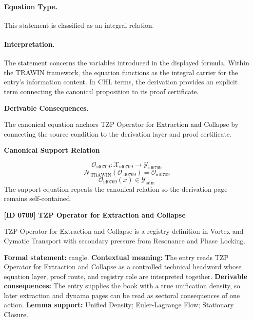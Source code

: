 \paragraph{Equation Type.}
This statement is classified as an integral relation.

\paragraph{Interpretation.}
The statement concerns the variables introduced in the displayed formula. Within the TRAWIN framework, the equation functions as the integral carrier for the entry’s information content. In CHL terms, the derivation provides an explicit term connecting the canonical proposition to its proof certificate.

\par\vspace{0.35em}
\noindent\textbf{Derivable Consequences.}\quad
\begingroup
\footnotesize
\raggedright
The canonical equation anchors TZP Operator for Extraction and Collapse by connecting the source condition to the derivation layer and proof certificate.
\par\endgroup

\noindent\textbf{Canonical Support Relation}\par
\[
\mathcal{O}_{\mathrm{id0709}}:\mathcal{X}_{\mathrm{id0709}}\longrightarrow\mathcal{Y}_{\mathrm{id0709}}
\]
\[
\mathcal{N}_{\mathrm{TRAWIN}}(\mathcal{O}_{\mathrm{id0709}})=\mathcal{O}_{\mathrm{id0709}}
\]
\[
\mathcal{O}_{\mathrm{id0709}}(x)\in\mathcal{Y}_{\mathrm{adm}}
\]
\noindent The support equation repeats the canonical relation so the derivation page remains self-contained.\par

\clearpage
\noindent\textbf{[ID 0709] TZP Operator for Extraction and Collapse}\par
\vspace{0.35em}
\begingroup\small
{}
TZP Operator for Extraction and Collapse is a registry definition in Vortex and Cymatic Transport with secondary pressure from Resonance and Phase Locking.

\begingroup\footnotesize\setlength{\emergencystretch}{3em}\sloppy
\textbf{Formal statement:} rangle. \textbf{Contextual meaning:} The entry reads TZP Operator for Extraction and Collapse as a controlled technical headword whose equation layer, proof route, and registry role are interpreted together. \textbf{Derivable consequences:} The entry supplies the book with a true unification density, so later extraction and dynamo pages can be read as sectoral consequences of one action. \textbf{Lemma support:} Unified Density; Euler-Lagrange Flow; Stationary Closure.\par
\endgroup

